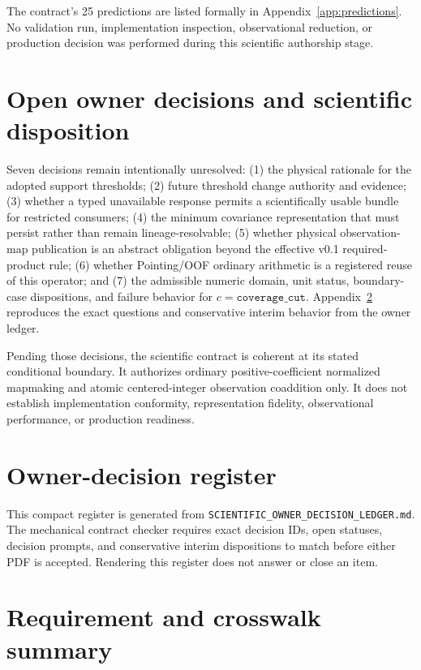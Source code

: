 \documentclass[10pt]{article}
\newcommand{\code}[1]{\nolinkurl{#1}}
\begin{document}
The contract's 25 predictions are listed formally in
Appendix~\ref{app:predictions}. No validation run, implementation inspection,
observational reduction, or production decision was performed during this
scientific authorship stage.

\clearpage
\section{Open owner decisions and scientific disposition}

Seven decisions remain intentionally unresolved: (1) the physical rationale
for the adopted support thresholds; (2) future threshold change authority and
evidence; (3) whether a typed unavailable response permits a scientifically
usable bundle for restricted consumers; (4) the minimum covariance
representation that must persist rather than remain lineage-resolvable; (5)
whether physical observation-map publication is an abstract obligation beyond
the effective v0.1 required-product rule; (6) whether Pointing/OOF ordinary
arithmetic is a registered reuse of this operator; and (7) the admissible
numeric domain, unit status, boundary-case dispositions, and failure behavior
for \(c=\texttt{coverage\_cut}\). Appendix~\ref{app:owner-decisions} reproduces
the exact questions and conservative interim behavior from the owner ledger.

Pending those decisions, the scientific contract is coherent at its stated
conditional boundary. It authorizes ordinary positive-coefficient normalized
mapmaking and atomic centered-integer observation coaddition only. It does not
establish implementation conformity, representation fidelity, observational
performance, or production readiness.

\appendix
\clearpage
\section{Owner-decision register}\label{app:owner-decisions}

This compact register is generated from
\code{SCIENTIFIC_OWNER_DECISION_LEDGER.md}. The mechanical contract checker
requires exact decision IDs, open statuses, decision prompts, and conservative
interim dispositions to match before either PDF is accepted. Rendering this
register does not answer or close an item.



\clearpage
\section{Requirement and crosswalk summary}\label{app:traceability-summary}
\end{document}
